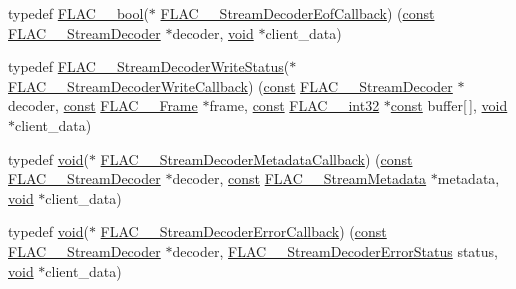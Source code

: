 \begin{DoxyCompactItemize}
\item 
typedef \hyperlink{ordinals_8h_a95103469f1cbd78b8cf250194985b34e}{F\+L\+A\+C\+\_\+\+\_\+bool}($\ast$ \hyperlink{group__flac__stream__decoder_ga4eac094fc609363532d90cf8374b4f7e}{F\+L\+A\+C\+\_\+\+\_\+\+Stream\+Decoder\+Eof\+Callback}) (\hyperlink{zconf_8h_a2c212835823e3c54a8ab6d95c652660e}{const} \hyperlink{struct_f_l_a_c_____stream_decoder}{F\+L\+A\+C\+\_\+\+\_\+\+Stream\+Decoder} $\ast$decoder, \hyperlink{png_8h_ac9c84fa68bbad002983e35ce3663c686}{void} $\ast$client\+\_\+data)
\item 
typedef \hyperlink{group__flac__stream__decoder_ga73f67eb9e0ab57945afe038751bc62c8}{F\+L\+A\+C\+\_\+\+\_\+\+Stream\+Decoder\+Write\+Status}($\ast$ \hyperlink{group__flac__stream__decoder_ga61e48dc2c0d2f6c5519290ff046874a4}{F\+L\+A\+C\+\_\+\+\_\+\+Stream\+Decoder\+Write\+Callback}) (\hyperlink{zconf_8h_a2c212835823e3c54a8ab6d95c652660e}{const} \hyperlink{struct_f_l_a_c_____stream_decoder}{F\+L\+A\+C\+\_\+\+\_\+\+Stream\+Decoder} $\ast$decoder, \hyperlink{zconf_8h_a2c212835823e3c54a8ab6d95c652660e}{const} \hyperlink{struct_f_l_a_c_____frame}{F\+L\+A\+C\+\_\+\+\_\+\+Frame} $\ast$frame, \hyperlink{zconf_8h_a2c212835823e3c54a8ab6d95c652660e}{const} \hyperlink{ordinals_8h_a33fd77bfe6d685541a0c034a75deccdc}{F\+L\+A\+C\+\_\+\+\_\+int32} $\ast$\hyperlink{zconf_8h_a2c212835823e3c54a8ab6d95c652660e}{const} buffer\mbox{[}$\,$\mbox{]}, \hyperlink{png_8h_ac9c84fa68bbad002983e35ce3663c686}{void} $\ast$client\+\_\+data)
\item 
typedef \hyperlink{png_8h_ac9c84fa68bbad002983e35ce3663c686}{void}($\ast$ \hyperlink{group__flac__stream__decoder_ga6aa87c01744c1c601b7f371f627b6e14}{F\+L\+A\+C\+\_\+\+\_\+\+Stream\+Decoder\+Metadata\+Callback}) (\hyperlink{zconf_8h_a2c212835823e3c54a8ab6d95c652660e}{const} \hyperlink{struct_f_l_a_c_____stream_decoder}{F\+L\+A\+C\+\_\+\+\_\+\+Stream\+Decoder} $\ast$decoder, \hyperlink{zconf_8h_a2c212835823e3c54a8ab6d95c652660e}{const} \hyperlink{struct_f_l_a_c_____stream_metadata}{F\+L\+A\+C\+\_\+\+\_\+\+Stream\+Metadata} $\ast$metadata, \hyperlink{png_8h_ac9c84fa68bbad002983e35ce3663c686}{void} $\ast$client\+\_\+data)
\item 
typedef \hyperlink{png_8h_ac9c84fa68bbad002983e35ce3663c686}{void}($\ast$ \hyperlink{group__flac__stream__decoder_gac896ee6a12668e9015fab4fbc6aae996}{F\+L\+A\+C\+\_\+\+\_\+\+Stream\+Decoder\+Error\+Callback}) (\hyperlink{zconf_8h_a2c212835823e3c54a8ab6d95c652660e}{const} \hyperlink{struct_f_l_a_c_____stream_decoder}{F\+L\+A\+C\+\_\+\+\_\+\+Stream\+Decoder} $\ast$decoder, \hyperlink{group__flac__stream__decoder_ga130e70bd9a73d3c2416247a3e5132ecf}{F\+L\+A\+C\+\_\+\+\_\+\+Stream\+Decoder\+Error\+Status} status, \hyperlink{png_8h_ac9c84fa68bbad002983e35ce3663c686}{void} $\ast$client\+\_\+data)
\end{DoxyCompactItemize}
